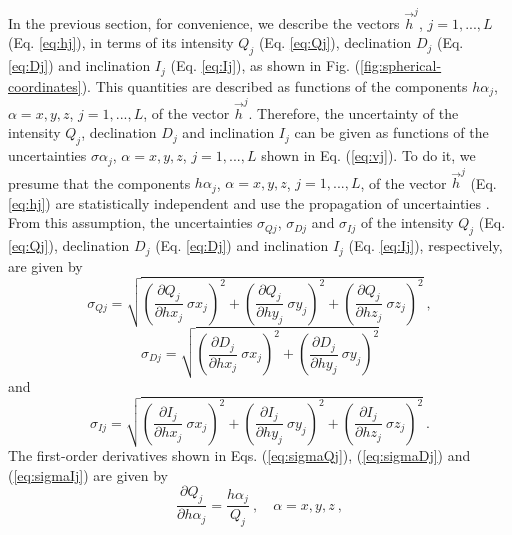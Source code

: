 \documentclass[journal abbreviation, npg]{copernicus}
\begin{document}
In the previous section, for convenience, we describe the vectors $\vec{h}^{j}$, $j = 1, ..., L$ (Eq. \ref{eq:hj}), in terms of its intensity $Q_{j}$ (Eq. \ref{eq:Qj}), declination $D_{j}$ (Eq. \ref{eq:Dj}) and inclination $I_{j}$ (Eq. \ref{eq:Ij}), as shown in Fig. (\ref{fig:spherical-coordinates}). This quantities are described as functions of the components ${h \alpha}_{j}$, $\alpha = x, y, z$, $j = 1, ..., L$, of the vector $\vec{h}^{j}$. Therefore, the uncertainty of the intensity $Q_{j}$, declination $D_{j}$ and inclination $I_{j}$ can be given as functions of the uncertainties ${\sigma \alpha}_{j}$, $\alpha = x, y, z$, $j = 1, ..., L$ shown in Eq. (\ref{eq:vj}). To do it, we presume that the components ${h \alpha}_{j}$, $\alpha = x, y, z$, $j = 1, ..., L$, of the vector $\vec{h}^{j}$ (Eq. \ref{eq:hj}) are statistically independent and use the propagation of uncertainties \citep{fornasini2008}. From this assumption, the uncertainties $\sigma_{Qj}$, $\sigma_{Dj}$ and $\sigma_{Ij}$ of the intensity $Q_{j}$ (Eq. \ref{eq:Qj}), declination $D_{j}$ (Eq. \ref{eq:Dj}) and inclination $I_{j}$ (Eq. \ref{eq:Ij}), respectively, are given by
\begin{equation}
\sigma_{Qj} = \sqrt{\left( \frac{\partial Q_{j}}{\partial hx_{j}} \: \sigma x_{j} \right)^{2} +
                    \left( \frac{\partial Q_{j}}{\partial hy_{j}} \: \sigma y_{j} \right)^{2} +
                    \left( \frac{\partial Q_{j}}{\partial hz_{j}} \: \sigma z_{j} \right)^{2}} \: ,
\label{eq:sigmaQj}
\end{equation}
\begin{equation}
\sigma_{Dj} = \sqrt{\left( \frac{\partial D_{j}}{\partial hx_{j}} \: \sigma x_{j} \right)^{2} +
                    \left( \frac{\partial D_{j}}{\partial hy_{j}} \: \sigma y_{j} \right)^{2}}
\label{eq:sigmaDj}
\end{equation}
and
\begin{equation}
\sigma_{Ij} = \sqrt{\left( \frac{\partial I_{j}}{\partial hx_{j}} \: \sigma x_{j} \right)^{2} +
                    \left( \frac{\partial I_{j}}{\partial hy_{j}} \: \sigma y_{j} \right)^{2} +
                    \left( \frac{\partial I_{j}}{\partial hz_{j}} \: \sigma z_{j} \right)^{2}} \: .
\label{eq:sigmaIj}
\end{equation}
The first-order derivatives shown in Eqs. (\ref{eq:sigmaQj}), (\ref{eq:sigmaDj}) and (\ref{eq:sigmaIj}) are given by
\begin{equation}
\dfrac{\partial Q_{j}}{\partial h \alpha_{j}} = \dfrac{h \alpha_{j}}{Q_{j}} \: , \quad \alpha = x, y, z \: ,
\label{eq:dQj-dhalphaj}
\end{equation}
\end{document}
